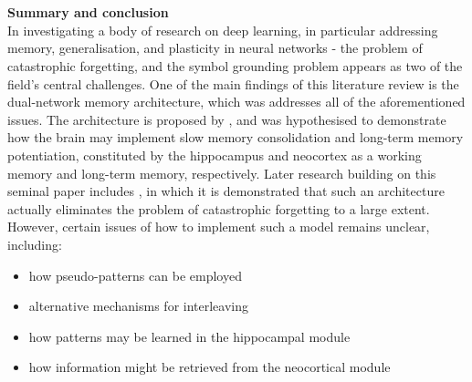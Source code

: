 \\
\\
\textbf{Summary and conclusion}
\\
In investigating a body of research on deep learning, in particular addressing memory, generalisation, and plasticity in neural networks - the problem of catastrophic forgetting, and the symbol grounding problem appears as two of the field's central challenges. One of the main findings of this literature review is the dual-network memory architecture, which was addresses all of the aforementioned issues. The architecture is proposed by \cite{McClelland1995}, and was hypothesised to demonstrate how the brain may implement slow memory consolidation and long-term memory potentiation, constituted by the hippocampus and neocortex as a working memory and long-term memory, respectively. Later research building on this seminal paper includes \cite{French1997, Ans1997, Ans2000, French2001, Hattori2010, Hattori2014}, in which it is demonstrated that such an architecture actually eliminates the problem of catastrophic forgetting to a large extent. However, certain issues of how to implement such a model remains unclear, including:
\begin{itemize}
\item how pseudo-patterns can be employed
\item alternative mechanisms for interleaving
\item how patterns may be learned in the hippocampal module
\item how information might be retrieved from the neocortical module
\end{itemize}
